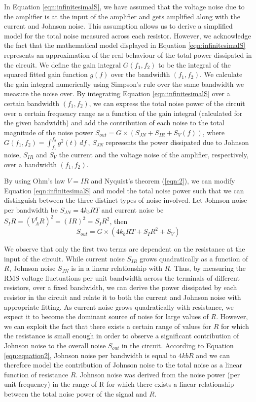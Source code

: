 \begin{linenumbers}
In Equation \ref{eqn:infinitesimalS}, we have assumed that the voltage noise due to the amplifier is at the input of the amplifier and gets amplified along with the current and Johnson noise. This assumption allows us to derive a simplified model for the total noise measured across each resistor. However, we acknowledge the fact that the mathematical model displayed in Equation \ref{eqn:infinitesimalS} represents an approximation of the real behaviour of the total power dissipated in the circuit. We define the gain integral $G(f_1,f_2)$ to be the integral of the squared fitted gain function $g(f)$ over the bandwidth $(f_1, f_2)$. We calculate the gain integral numerically using Simpson's rule \cite{article} over the same bandwidth we measure the noise over. By integrating Equation \ref{eqn:infinitesimalS} over a certain bandwidth $(f_1, f_2)$, we can express the total noise power of the circuit over a certain frequency range as a function of the gain integral (calculated for the given bandwidth) and add the contribution of each noise to the total magnitude of the noise power $S_{out}=G\times(S_{JN}+S_{IR}+S_{V} (f))$, where $G(f_1, f_2)= \int_{f_1}^{f_2} g^2(t)\,df\ $, $S_{JN}$ represents the power dissipated due to Johnson noise, $S_{IR}$ and $S_{V}$ the current and the voltage noise of the amplifier, respectively, over a bandwidth $(f_1,f_2)$.

 By using Ohm’s law $V=IR$ and Nyquist's theorem (\ref{eqn:2}), we can modify Equation \ref{eqn:infinitesimalS} and model the total noise power such that we can distinguish between the three distinct types of noise involved. Let Johnson noise per bandwidth be $S_{JN}= 4 k_bRT$ and current noise be $S_IR=(V_{A}^IR )^2 =(IR)^2=S_I R^2$, then 
\begin{equation}
\label{eqn:model}
     S_{out} =G\times(4 k_bRT+ S_I R^2+ S_V)  
\end{equation}

We observe that only the first two terms are dependent on the resistance at the input of the circuit. While current noise $S_{IR}$ grows quadratically as a function of $R$, Johnson noise $S_{JN}$  is in a linear relationship with $R$. Thus, by measuring the RMS voltage fluctuations per unit bandwidth across the terminals of different resistors, over a fixed bandwidth, we can derive the power dissipated by each resistor in the circuit and relate it to both the current and Johnson noise with appropriate fitting. As current noise grows quadratically with resistance, we expect it to become the dominant source of noise for large values of $R$. However, we can exploit the fact that there exists a certain range of values for $R$ for which the resistance is small enough in order to observe a significant contribution of Johnson noise to the overall noise $S_{out}$ in the circuit. According to Equation \ref{eqn:equation2}, Johnson noise per bandwidth is equal to $4kbR$ and we can therefore model the contribution of Johnson noise to the total noise as a linear function of resistance $R$. Johnson noise was derived from the noise power (per unit frequency) in the range of R for which there exists a linear relationship between the total noise power of the signal and $R$.


\end{linenumbers}
